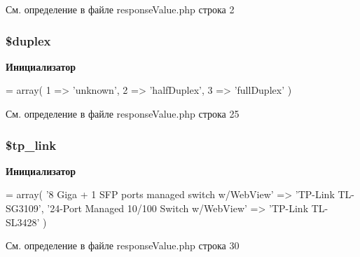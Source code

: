См. определение в файле response\-Value.\-php строка 2

\hypertarget{response_value_8php_a56a6c878ef4d3c87cd7e23a5a8a711bf}{
\subsubsection[{\$duplex}]{\setlength{\rightskip}{0pt plus 5cm}\$duplex}}\label{response_value_8php_a56a6c878ef4d3c87cd7e23a5a8a711bf}
{\bfseries Инициализатор}
\begin{DoxyCode}
= array(
    1 => \textcolor{stringliteral}{'unknown'},
    2 => \textcolor{stringliteral}{'halfDuplex'},
    3 => \textcolor{stringliteral}{'fullDuplex'}
)
\end{DoxyCode}


См. определение в файле response\-Value.\-php строка 25

\hypertarget{response_value_8php_aad99044bfc955d333452214ca7eeba97}{
\subsubsection[{\$tp\-\_\-link}]{\setlength{\rightskip}{0pt plus 5cm}\$tp\-\_\-link}}\label{response_value_8php_aad99044bfc955d333452214ca7eeba97}
{\bfseries Инициализатор}
\begin{DoxyCode}
= array(
    \textcolor{stringliteral}{'8 Giga + 1 SFP ports managed switch w/WebView'} => \textcolor{stringliteral}{'TP-Link TL-SG3109'},
    \textcolor{stringliteral}{'24-Port Managed 10/100 Switch w/WebView'} => \textcolor{stringliteral}{'TP-Link TL-SL3428'}
)
\end{DoxyCode}


См. определение в файле response\-Value.\-php строка 30

